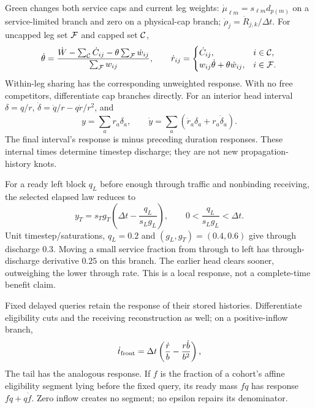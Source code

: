 \documentclass[10pt,a4paper]{article}
\begin{document}
Green changes both service caps and current leg weights:
$\dot\mu_{\ell m}=s_{\ell m}d_{p(m)}$ on a service-limited branch
and zero on a physical-cap branch; $\dot\rho_j=\dot R_{j,k}/\Delta t$.
For uncapped leg set ${\cal F}$ and capped set ${\cal C}$,
\begin{equation}
 \dot\theta=
 \frac{\dot W-\sum_{\cal C}\dot C_{ij}
               -\theta\sum_{\cal F}\dot w_{ij}}
      {\sum_{\cal F}w_{ij}},\qquad
 \dot r_{ij}=
 \begin{cases}
 \dot C_{ij},&i\in{\cal C},\\
 w_{ij}\dot\theta+\theta\dot w_{ij},&i\in{\cal F}.
 \end{cases}
 \label{eq:compact-sharing-derivative}
\end{equation}
Within-leg sharing has the corresponding unweighted response.
With no free competitors, differentiate cap branches directly.
For an interior head interval $\delta=q/r$,
$\dot\delta=\dot q/r-q\dot r/r^2$, and
\begin{equation}
 y=\sum_a r_a\delta_a,\qquad
 \dot y=\sum_a(\dot r_a\delta_a+r_a\dot\delta_a).
 \label{eq:compact-service-derivative}
\end{equation}
The final interval's response is minus preceding duration responses.
These internal times determine timestep discharge; they are not new
propagation-history knots.

For a ready left block $q_L$ before enough through traffic and
nonbinding receiving, the selected elapsed law reduces to
\begin{equation}
 y_T=s_Tg_T\left(\Delta t-\frac{q_L}{s_Lg_L}\right),
 \qquad 0<\frac{q_L}{s_Lg_L}<\Delta t.
 \label{eq:compact-service}
\end{equation}
Unit timestep/saturations, $q_L=0.2$ and $(g_L,g_T)=(0.4,0.6)$ give
through discharge $0.3$. Moving a small service fraction from through
to left has through-discharge derivative $0.25$ on this branch.
The earlier head clears sooner, outweighing the lower through rate.
This is a local response, not a complete-time benefit claim.

Fixed delayed queries retain the response of their stored histories.
Differentiate eligibility cuts and the receiving reconstruction as well;
on a positive-inflow branch,
\begin{equation}
 \dot t_{\rm front}
 =\Delta t\left(\frac{\dot r}{b}-\frac{r\dot b}{b^2}\right),
 \label{eq:compact-entry-derivative}
\end{equation}
The tail has the analogous response. If $f$ is the fraction of a cohort's
affine eligibility segment lying before the fixed query, its ready mass
$fq$ has response $f\dot q+q\dot f$. Zero inflow creates no segment;
no epsilon repairs its denominator.
\end{document}

